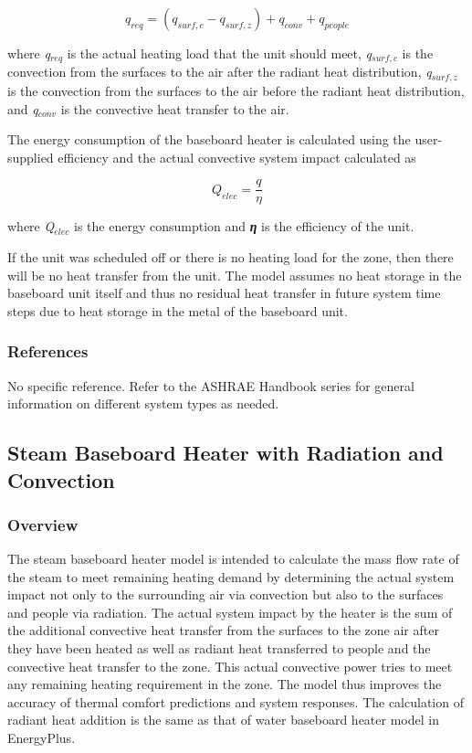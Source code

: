 \begin{equation}
{q_{req}} = ({q_{surf,c}} - {q_{surf,z}}) + {q_{conv}} + {q_{people}}
\end{equation}

where \emph{q\(_{req}\)} is the actual heating load that the unit should meet, \emph{q\(_{surf,c}\)} is the convection from the surfaces to the air after the radiant heat distribution, \emph{q\(_{surf,z}\)} is the convection from the surfaces to the air before the radiant heat distribution, and \emph{q\(_{conv}\)} is the convective heat transfer to the air.

The energy consumption of the baseboard heater is calculated using the user-supplied efficiency and the actual convective system impact calculated as

\begin{equation}
{Q_{elec}} = \frac{q}{\eta }
\end{equation}

where \emph{Q\(_{elec}\)} is the energy consumption and \textbf{\emph{η}} is the efficiency of the unit.

If the unit was scheduled off or there is no heating load for the zone, then there will be no heat transfer from the unit. The model assumes no heat storage in the baseboard unit itself and thus no residual heat transfer in future system time steps due to heat storage in the metal of the baseboard unit.

\subsubsection{References}\label{references-020}

No specific reference. Refer to the ASHRAE Handbook series for general information on different system types as needed.

\subsection{Steam Baseboard Heater with Radiation and Convection}\label{steam-baseboard-heater-with-radiation-and-convection}

\subsubsection{Overview}\label{overview-1-006}

The steam baseboard heater model is intended to calculate the mass flow rate of the steam to meet remaining heating demand by determining the actual system impact not only to the surrounding air via convection but also to the surfaces and people via radiation. The actual system impact by the heater is the sum of the additional convective heat transfer from the surfaces to the zone air after they have been heated as well as radiant heat transferred to people and the convective heat transfer to the zone. This actual convective power tries to meet any remaining heating requirement in the zone. The model thus improves the accuracy of thermal comfort predictions and system responses. The calculation of radiant heat addition is the same as that of water baseboard heater model in EnergyPlus.

